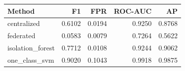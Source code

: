 \begin{tabular}{lrrrr}
Method & F1 & FPR & ROC-AUC & AP \\ \hline
centralized & 0.6102 & 0.0194 & 0.9250 & 0.8768 \\
federated & 0.0583 & 0.0079 & 0.7264 & 0.5622 \\
isolation\_forest & 0.7712 & 0.0108 & 0.9244 & 0.9062 \\
one\_class\_svm & 0.9020 & 0.1043 & 0.9918 & 0.9875 \\
\end{tabular}
